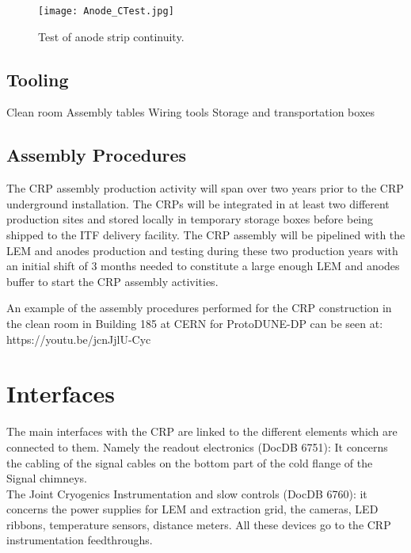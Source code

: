 \begin{figure}[h!]
  \centering
  \texttt{[image: Anode\_CTest.jpg]}
  \caption{Test of anode strip continuity.}
  \label{fig:Anode_CTest} 
\end{figure}



\subsection{Tooling}
\label{sec:fddp-crp-tooling}

Clean room
Assembly tables 
Wiring tools
Storage and transportation boxes


\subsection{Assembly Procedures}
\label{sec:fddp-crp-assy}

The CRP assembly production activity will span over two years prior to the CRP underground installation. The CRPs will be integrated in at least two different production sites and stored locally in temporary storage boxes before being shipped to the ITF delivery facility. The CRP assembly will be pipelined with the LEM and anodes production and testing during these two production years with an initial  shift of 3 months needed to constitute a large enough LEM and anodes buffer to start the CRP assembly activities.


An example of the assembly procedures performed for the CRP  construction in the clean room in Building 185 at CERN for ProtoDUNE-DP can be seen at: https://youtu.be/jcnJjlU-Cyc


\section{Interfaces}
\label{sec:fddp-crp-intfc}

The main interfaces with the CRP are linked to the different elements which are connected to them. Namely the readout electronics  (DocDB 6751): It 
concerns the cabling of the signal cables on the bottom part of the cold 
flange of the Signal chimneys.  \\
The Joint Cryogenics Instrumentation and slow controls (DocDB 6760):  it  concerns the power supplies for LEM and extraction grid, the cameras, LED ribbons, temperature sensors, distance meters. All these devices go to the CRP instrumentation feedthroughs. \\

